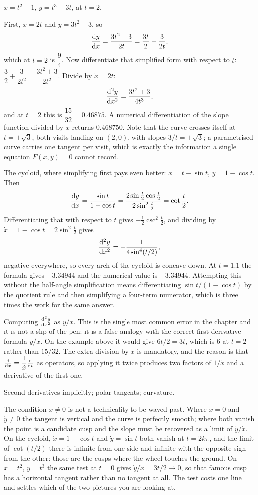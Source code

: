 \begin{worked}
$x=t^{2}-1$, $y=t^{3}-3t$, at $t=2$.

First, $\dot x=2t$ and $\dot y=3t^{2}-3$, so
\[
\frac{\mathrm{d}y}{\mathrm{d}x}=\frac{3t^{2}-3}{2t}=\frac{3t}{2}-\frac{3}{2t},
\]
which at $t=2$ is $\dfrac94$. Now differentiate that simplified form with respect to $t$: $\dfrac32+\dfrac{3}{2t^{2}}=\dfrac{3t^{2}+3}{2t^{2}}$. Divide by $\dot x=2t$:
\[
\frac{\mathrm{d}^{2}y}{\mathrm{d}x^{2}}=\frac{3t^{2}+3}{4t^{3}},
\]
and at $t=2$ this is $\dfrac{15}{32}=0.46875$. A numerical differentiation of the slope function divided by $\dot x$ returns $0.468750$. Note that the curve crosses itself at $t=\pm\sqrt3$, both visits landing on $(2,0)$, with slopes $3/t=\pm\sqrt3$; a parametrised curve carries one tangent per visit, which is exactly the information a single equation $F(x,y)=0$ cannot record.

The cycloid, where simplifying first pays even better: $x=t-\sin t$, $y=1-\cos t$. Then
\[
\frac{\mathrm{d}y}{\mathrm{d}x}=\frac{\sin t}{1-\cos t}=\frac{2\sin\tfrac t2\cos\tfrac t2}{2\sin^{2}\tfrac t2}=\cot\frac t2 .
\]
Differentiating that with respect to $t$ gives $-\tfrac12\csc^{2}\tfrac t2$, and dividing by $\dot x=1-\cos t=2\sin^{2}\tfrac t2$ gives
\[
\frac{\mathrm{d}^{2}y}{\mathrm{d}x^{2}}=-\frac{1}{4\sin^{4}(t/2)} ,
\]
negative everywhere, so every arch of the cycloid is concave down. At $t=1.1$ the formula gives $-3.34944$ and the numerical value is $-3.34944$. Attempting this without the half-angle simplification means differentiating $\sin t/(1-\cos t)$ by the quotient rule and then simplifying a four-term numerator, which is three times the work for the same answer.
\end{worked}

\begin{trap}
Computing $\frac{\mathrm{d}^{2}y}{\mathrm{d}x^{2}}$ as $\ddot y/\ddot x$. This is the single most common error in the chapter and it is not a slip of the pen: it is a false analogy with the correct first-derivative formula $\dot y/\dot x$. On the example above it would give $6t/2=3t$, which is $6$ at $t=2$ rather than $15/32$. The extra division by $\dot x$ is mandatory, and the reason is that $\frac{\mathrm{d}}{\mathrm{d}x}=\dfrac{1}{\dot x}\frac{\mathrm{d}}{\mathrm{d}t}$ as operators, so applying it twice produces two factors of $1/\dot x$ and a derivative of the first one.
\end{trap}

\begin{seealsob}Second derivatives implicitly; polar tangents; curvature.\end{seealsob}

The condition $\dot x\neq0$ is not a technicality to be waved past. Where $\dot x=0$ and $\dot y\neq0$ the tangent is vertical and the curve is perfectly smooth; where both vanish the point is a candidate cusp and the slope must be recovered as a limit of $\dot y/\dot x$. On the cycloid, $\dot x=1-\cos t$ and $\dot y=\sin t$ both vanish at $t=2k\pi$, and the limit of $\cot(t/2)$ there is infinite from one side and infinite with the opposite sign from the other: those are the cusps where the wheel touches the ground. On $x=t^{2}$, $y=t^{3}$ the same test at $t=0$ gives $\dot y/\dot x=3t/2\to0$, so that famous cusp has a horizontal tangent rather than no tangent at all. The test costs one line and settles which of the two pictures you are looking at.

